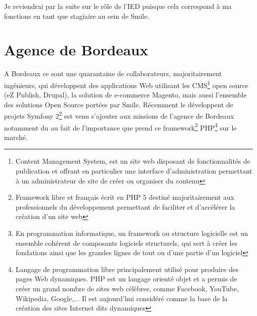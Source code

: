 \documentclass[a4paper,11pt,twoside]{report}
\begin{document}
  Je reviendrai par la suite sur le rôle de l'IED puisque cela correspond à ma fonctions en tant que stagiaire au sein de Smile.
  
  \section{Agence de Bordeaux}
  A Bordeaux ce sont une quarantaine de collaborateurs, majoritairement ingénieurs, qui développent des applications Web utilisant les CMS\footnote{Content Management System, est un site web disposant de fonctionnalités de publication et offrant en particulier une interface d'administration permettant à un administrateur de site de créer ou organiser du contenu} open source (eZ Publish, Drupal), la solution de e-commerce Magento, mais aussi l’ensemble des solutions Open Source portées par Smile. Récemment le développent de projets Symfony 2\footnote{Framework libre et français écrit en PHP 5 destiné majoritairement aux professionnels du développement permettant de faciliter et d’accélérer la création d'un site web} est venu s'ajouter aux missions de l'agence de Bordeaux notamment du au fait de l'importance que prend ce framework\footnote{En programmation informatique, un framework ou structure logicielle est un ensemble cohérent de composants logiciels structurels, qui sert à créer les fondations ainsi que les grandes lignes de tout ou d’une partie d'un logiciel} PHP\footnote{Langage de programmation libre principalement utilisé pour produire des pages Web dynamiques. PHP est un langage orienté objet et a permis de créer un grand nombre de sites web célèbres, comme Facebook, YouTube, Wikipedia, Google,... Il est aujourd'hui considéré comme la base de la création des sites Internet dits dynamiques} sur le marché.\newline
\end{document}
